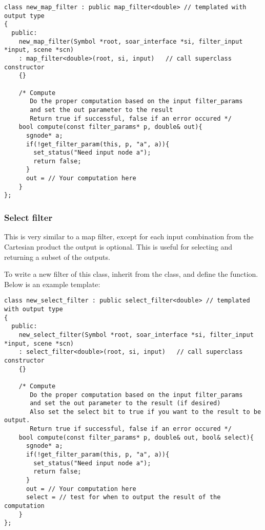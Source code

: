 {\footnotesize
\begin{verbatim}
class new_map_filter : public map_filter<double> // templated with output type
{
  public:
    new_map_filter(Symbol *root, soar_interface *si, filter_input *input, scene *scn)
    : map_filter<double>(root, si, input)   // call superclass constructor
    {}

    /* Compute
       Do the proper computation based on the input filter_params 
       and set the out parameter to the result 
       Return true if successful, false if an error occured */
    bool compute(const filter_params* p, double& out){
      sgnode* a;
      if(!get_filter_param(this, p, "a", a)){
        set_status("Need input node a");
        return false;
      }
      out = // Your computation here
    }
};
\end{verbatim}
}


\subsubsection{Select filter}

This is very similar to a map filter, except for each input combination from the 
Cartesian product the output is optional. This is useful for selecting and returning
a subset of the outputs. 

To write a new filter of this class, inherit from the  class, 
and define the  function. Below is an example template:

{\footnotesize
\begin{verbatim}
class new_select_filter : public select_filter<double> // templated with output type
{
  public:
    new_select_filter(Symbol *root, soar_interface *si, filter_input *input, scene *scn)
    : select_filter<double>(root, si, input)   // call superclass constructor
    {}

    /* Compute
       Do the proper computation based on the input filter_params 
       and set the out parameter to the result (if desired)
       Also set the select bit to true if you want to the result to be output. 
       Return true if successful, false if an error occured */
    bool compute(const filter_params* p, double& out, bool& select){
      sgnode* a;
      if(!get_filter_param(this, p, "a", a)){
        set_status("Need input node a");
        return false;
      }
      out = // Your computation here
      select = // test for when to output the result of the computation
    }
};
\end{verbatim}
}


